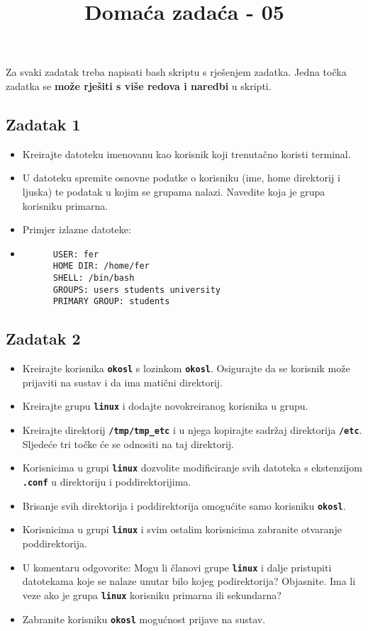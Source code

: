 \documentclass[12pt,a4paper]{article}
\newcommand{\shell}[1]{\texttt{\textbf{#1}}}
\begin{document}
	\title{Domaća zadaća - 05\vspace{-2em}}
	\maketitle
	Za svaki zadatak treba napisati bash skriptu s rješenjem zadatka. Jedna točka zadatka se \textbf{može rješiti s više redova i naredbi} u skripti. \\

	\subsection*{Zadatak 1}
   	\begin{itemize}
			\item Kreirajte datoteku imenovanu kao korisnik koji trenutačno koristi terminal. 
      \item U datoteku spremite osnovne podatke o korisniku (ime, home direktorij i ljuska) te podatak u kojim se grupama nalazi. Navedite koja je grupa korisniku primarna.
      \item[] Primjer izlazne datoteke:
      \item[] \begin{verbatim}
      USER: fer
      HOME DIR: /home/fer
      SHELL: /bin/bash
      GROUPS: users students university
      PRIMARY GROUP: students
      \end{verbatim}
		\end{itemize}
	\subsection*{Zadatak 2}
		\begin{itemize}
			\item Kreirajte korisnika \shell{okosl} s lozinkom \shell{okosl}. Osigurajte da se korisnik može prijaviti na sustav i da ima matični direktorij.
			\item Kreirajte grupu \shell{linux} i dodajte novokreiranog korisnika u grupu.
			\item Kreirajte direktorij \shell{/tmp/tmp\_etc} i u njega kopirajte sadržaj direktorija \shell{/etc}. Sljedeće tri točke će se odnositi na taj direktorij.
			\item Korisnicima u grupi \shell{linux} dozvolite modificiranje svih datoteka s ekstenzijom \shell{.conf} u direktoriju i poddirektorijima.
			\item Brisanje svih direktorija i poddirektorija omogućite samo korisniku \shell{okosl}.
	      \item Korisnicima u grupi \shell{linux} i svim ostalim korisnicima zabranite otvaranje poddirektorija.
	      \item[] U komentaru odgovorite: Mogu li članovi grupe \shell{linux} i dalje pristupiti datotekama koje se nalaze unutar bilo kojeg podirektorija? Objasnite. Ima li veze ako je grupa \shell{linux} korisniku primarna ili sekundarna?
      \item Zabranite korisniku \shell{okosl} mogućnost prijave na sustav.
		\end{itemize}
\end{document}
